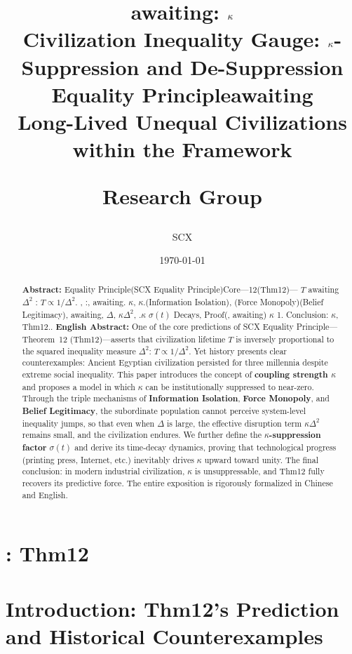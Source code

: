 \documentclass[11pt,a4paper]{article}
\title{
 {\Huge \textbf{awaiting: $\coupling$}}\\[0.3cm]
 {\Large Civilization Inequality Gauge: $\coupling$-Suppression and De-Suppression}\\[0.3cm]
 {\normalsize Equality Principleawaiting}\\
 {\normalsize Long-Lived Unequal Civilizations within the \eqtheory{} Framework}
\author{SCX} Research Group}
\date{\today}
\theoremstyle{definition}
\newcommand{\SCX}{\textsf{SCX}}
\newcommand{\eqtheory}{Equality Principle}
\newcommand{\coupling}{\kappa}
\newcommand{\suppress}{\sigma}
\begin{document}
\maketitle
\begin{abstract}
\noindent
\textbf{Abstract: }
Equality Principle(\SCX{} \eqtheory)Core---12(Thm12)--- $T$ awaiting $\Delta^2$ : $T \propto 1/\Delta^2$.
, :, awaiting.\textbf{ $\coupling$}, 
 $\coupling$.(Information Isolation), 
(Force Monopoly)(Belief Legitimacy), 
awaiting, $\Delta$, $\coupling\Delta^2$, 
.\textbf{$\coupling$ } $\suppress(t)$ Decays, 
Proof(, awaiting) $\coupling$ 1.
Conclusion: $\coupling$, Thm12..
\vspace{0.3cm}
\noindent
\textbf{English Abstract:}
One of the core predictions of \SCX{} \eqtheory{}---Theorem~12 (Thm12)---asserts that civilization lifetime
$T$ is inversely proportional to the squared inequality measure $\Delta^2$: $T \propto 1/\Delta^2$.
Yet history presents clear counterexamples: Ancient Egyptian civilization persisted for three millennia
despite extreme social inequality. This paper introduces the concept of \textbf{coupling strength $\coupling$}
and proposes a model in which $\coupling$ can be institutionally suppressed to near-zero. Through
the triple mechanisms of \textbf{Information Isolation}, \textbf{Force Monopoly}, and
\textbf{Belief Legitimacy}, the subordinate population cannot perceive system-level inequality jumps,
so that even when $\Delta$ is large, the effective disruption term $\coupling\Delta^2$ remains small,
and the civilization endures. We further define the \textbf{$\coupling$-suppression factor} $\suppress(t)$
and derive its time-decay dynamics, proving that technological progress (printing press, Internet, etc.)
inevitably drives $\coupling$ upward toward unity. The final conclusion: in modern industrial civilization,
$\coupling$ is unsuppressable, and Thm12 fully recovers its predictive force. The entire exposition is
rigorously formalized in Chinese and English.
\end{abstract}
\newpage
\tableofcontents
\newpage
\section{: Thm12}
\section{Introduction: Thm12's Prediction and Historical Counterexamples}
\end{document}
